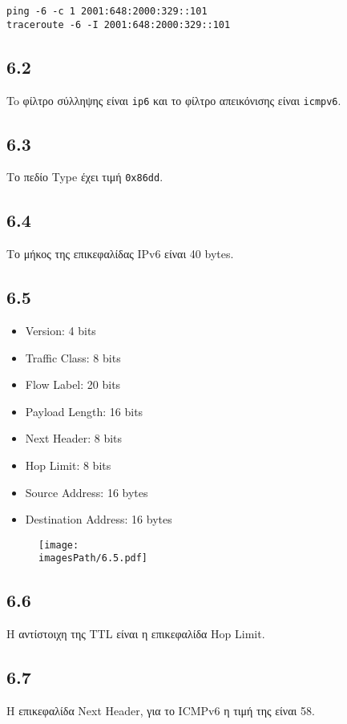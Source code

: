			\verb|ping -6 -c 1 2001:648:2000:329::101| \\
			\verb|traceroute -6 -I 2001:648:2000:329::101 |

		\subsection*{6.2}
			To φίλτρο σύλληψης είναι \verb|ip6| και το φίλτρο απεικόνισης είναι \verb|icmpv6|. 

		\subsection*{6.3}
			Το πεδίο Type έχει τιμή \verb|0x86dd|.

		\subsection*{6.4}
			Το μήκος της επικεφαλίδας IPv6 είναι 40 bytes.

		\subsection*{6.5}
			\begin{itemize}
				\item Version: 4 bits
				\item Traffic Class: 8 bits 
				\item Flow Label: 20 bits
				\item Payload Length: 16 bits
				\item Next Header: 8 bits
				\item Hop Limit: 8 bits
				\item Source Address: 16 bytes
				\item Destination Address: 16 bytes
			\end{itemize}
		
			\begin{figure}[H]
				\texttt{[image: \\imagesPath/6.5.pdf]}
			\end{figure}
			
		\subsection*{6.6}
			Η αντίστοιχη της TTL είναι η επικεφαλίδα Hop Limit.

		\subsection*{6.7}
			Η επικεφαλίδα Next Header, για το ICMPv6 η τιμή της είναι 58.

